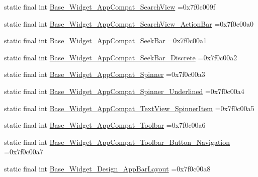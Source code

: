\begin{DoxyCompactItemize}
\item 
static final int \mbox{\hyperlink{classbr_1_1unb_1_1cic_1_1mp_1_1marketmaster_1_1test_1_1R_1_1style_ac07a4b9fc6575760ccfef8d789be19c9}{Base\+\_\+\+Widget\+\_\+\+App\+Compat\+\_\+\+Search\+View}} =0x7f0c009f
\item 
static final int \mbox{\hyperlink{classbr_1_1unb_1_1cic_1_1mp_1_1marketmaster_1_1test_1_1R_1_1style_accd58cf790e4f605c78826c909a81d36}{Base\+\_\+\+Widget\+\_\+\+App\+Compat\+\_\+\+Search\+View\+\_\+\+Action\+Bar}} =0x7f0c00a0
\item 
static final int \mbox{\hyperlink{classbr_1_1unb_1_1cic_1_1mp_1_1marketmaster_1_1test_1_1R_1_1style_adb937f73e98e1357cf4d60f2a0056fc3}{Base\+\_\+\+Widget\+\_\+\+App\+Compat\+\_\+\+Seek\+Bar}} =0x7f0c00a1
\item 
static final int \mbox{\hyperlink{classbr_1_1unb_1_1cic_1_1mp_1_1marketmaster_1_1test_1_1R_1_1style_ad0c38f8fe433f4b4f230de34a02a3a64}{Base\+\_\+\+Widget\+\_\+\+App\+Compat\+\_\+\+Seek\+Bar\+\_\+\+Discrete}} =0x7f0c00a2
\item 
static final int \mbox{\hyperlink{classbr_1_1unb_1_1cic_1_1mp_1_1marketmaster_1_1test_1_1R_1_1style_a25513558ac6b5e6fdccd45ebbea9b1d5}{Base\+\_\+\+Widget\+\_\+\+App\+Compat\+\_\+\+Spinner}} =0x7f0c00a3
\item 
static final int \mbox{\hyperlink{classbr_1_1unb_1_1cic_1_1mp_1_1marketmaster_1_1test_1_1R_1_1style_ab3b580eb38c1202d1b3da17b15949acd}{Base\+\_\+\+Widget\+\_\+\+App\+Compat\+\_\+\+Spinner\+\_\+\+Underlined}} =0x7f0c00a4
\item 
static final int \mbox{\hyperlink{classbr_1_1unb_1_1cic_1_1mp_1_1marketmaster_1_1test_1_1R_1_1style_adaca0b5f9721f43cb90472d452af7281}{Base\+\_\+\+Widget\+\_\+\+App\+Compat\+\_\+\+Text\+View\+\_\+\+Spinner\+Item}} =0x7f0c00a5
\item 
static final int \mbox{\hyperlink{classbr_1_1unb_1_1cic_1_1mp_1_1marketmaster_1_1test_1_1R_1_1style_a59fec0fa8fc8c1962e523759ea2d2b65}{Base\+\_\+\+Widget\+\_\+\+App\+Compat\+\_\+\+Toolbar}} =0x7f0c00a6
\item 
static final int \mbox{\hyperlink{classbr_1_1unb_1_1cic_1_1mp_1_1marketmaster_1_1test_1_1R_1_1style_af7e348e1f08a6af1d8754017d8f1ebbf}{Base\+\_\+\+Widget\+\_\+\+App\+Compat\+\_\+\+Toolbar\+\_\+\+Button\+\_\+\+Navigation}} =0x7f0c00a7
\item 
static final int \mbox{\hyperlink{classbr_1_1unb_1_1cic_1_1mp_1_1marketmaster_1_1test_1_1R_1_1style_aeaddd017c5d598b1957ced6a731f99dd}{Base\+\_\+\+Widget\+\_\+\+Design\+\_\+\+App\+Bar\+Layout}} =0x7f0c00a8

\end{DoxyCompactItemize}
